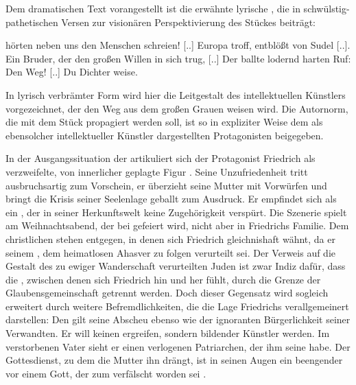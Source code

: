 Dem dramatischen Text vorangestellt ist die erwähnte lyrische
\Cite{Aufrüttelung} , die in schwülstig-pathetischen Versen
zur visionären Perspektivierung des Stückes beiträgt:

\begin{BlockQuote}
  [Wir] hörten neben uns den Menschen schreien! [..] Europa troff, entblößt von
  Sudel [..]. Ein Bruder, der den großen Willen in sich trug, [..] Der ballte
  lodernd harten Ruf: Den Weg! [..] Du Dichter weise.
\end{BlockQuote}
In lyrisch verbrämter Form wird hier die Leitgestalt des intellektuellen
Künstlers vorgezeichnet, der den Weg aus dem großen Grauen weisen wird. Die
Autornorm, die mit dem Stück propagiert werden soll, ist so in expliziter
Weise dem als ebensolcher intellektueller Künstler dargestellten Protagonisten
beigegeben.


In der Ausgangssituation der  artikuliert sich der
Protagonist Friedrich als verzweifelte, von innerlicher \Cite{Zerrissenheit} 
geplagte Figur . Seine Unzufriedenheit tritt ausbruchsartig
zum Vorschein, er
überzieht seine Mutter mit Vorwürfen und bringt die Krisis seiner Seelenlage
geballt zum Ausdruck. Er empfindet sich als ein \Cite{Ausgestoßner}, der in
seiner Herkunftswelt keine Zugehörigkeit verspürt. Die Szenerie spielt am
Weihnachtsabend, der bei \Cite{denen drüben} gefeiert wird, nicht aber in
Friedrichs Familie. Dem christlichen \Cite{Lichtmeer der Liebe} stehen
\Cite{pestige Kellerhöhlen} entgegen, in denen sich Friedrich gleichnishaft
wähnt, da er seinem \Cite{großen Bruder}, dem heimatlosen Ahasver zu folgen
verurteilt sei. Der Verweis auf die Gestalt des zu ewiger Wanderschaft
verurteilten Juden ist zwar Indiz dafür, dass die \Cite{Ufer}, zwischen denen
sich Friedrich hin und her \Cite{taumeln} fühlt, durch die Grenze der
Glaubensgemeinschaft getrennt werden. Doch dieser Gegensatz wird sogleich
erweitert durch weitere Befremdlichkeiten, die die \Cite{heimatlose} Lage
Friedrichs verallgemeinert darstellen: Den \Cite{wohlarrangierten
  Familienbildern aus gesitteten Häusern}  gilt seine
Abscheu ebenso wie der
ignoranten Bürgerlichkeit seiner Verwandten. Er will keinen \Cite{Brotberuf}
ergreifen, sondern bildender Künstler werden. Im verstorbenen Vater sieht er
einen verlogenen Patriarchen, der ihm seine \Cite{Jugend versperrt} habe. Der
Gottesdienst, zu dem die Mutter ihn drängt, ist in seinen Augen ein beengender
\Cite{Leutedienst} vor einem Gott, der zum \Cite{verknöcherten Richter}
verfälscht worden sei .

